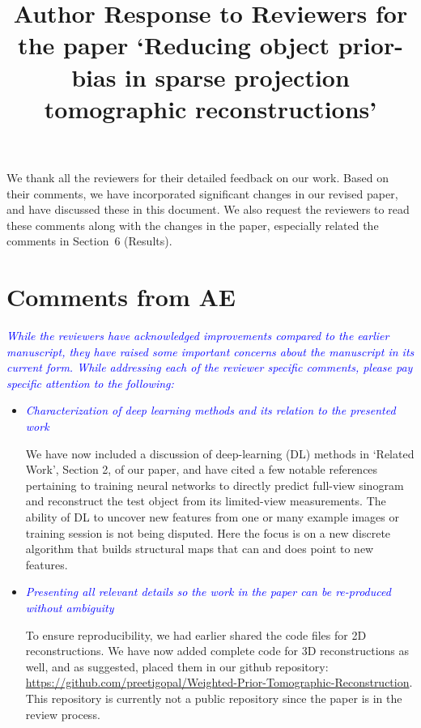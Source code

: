 \documentclass{article}
\title{Author Response to Reviewers for the paper `Reducing object prior-bias in sparse projection tomographic reconstructions'}
\begin{document}
\maketitle

We thank all the reviewers for their detailed feedback on our
work. Based on their comments, we have incorporated significant
changes in our revised paper, and have discussed these in this
document. We also request the reviewers to read these comments along
with the changes in the paper, especially related the comments in
Section~6 (Results).


\section{Comments from AE}

\textcolor{blue}{\textit{While the reviewers have acknowledged
    improvements compared to the earlier manuscript, they have raised
    some important concerns about the manuscript in its current
    form. While addressing each of the reviewer specific comments,
    please pay specific attention to the following:}} 

  \begin{itemize}
  \item \textcolor{blue}{\textit{Characterization of deep learning
        methods and its relation to the presented work}} 

    We have now included a discussion of deep-learning (DL) methods in
    `Related Work', Section 2, of our paper, and have cited a few
    notable references pertaining to training neural networks to
    directly predict full-view sinogram and reconstruct the test
    object from its limited-view measurements. The ability of DL to
    uncover new features from one or many example images or training
    session is not being disputed. Here the focus is on a new discrete
    algorithm that builds structural maps that can and does point to
    new features.

    \item\textcolor{blue}{\textit{Presenting all relevant details so
          the work in the paper can be re-produced without ambiguity}} 
      

      To ensure reproducibility, we had earlier shared the code files
      for 2D reconstructions. We have now added complete code for 3D
      reconstructions as well, and as suggested, placed them in our
      github repository:
      \url{https://github.com/preetigopal/Weighted-Prior-Tomographic-Reconstruction}.
      This repository is currently not a public repository since the
      paper is in the review process.

  \end{itemize}
\end{document}
